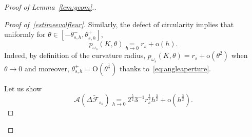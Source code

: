 \documentclass[AHL,Unicode,longabstracts,published]{cedram}
\newcommand{\cA}{\mathcal{A}}
\newcommand{\cF}{\mathcal{F}}
\newcommand{\od}{\mathrm{o}}
\newcommand{\Odd}{\mathrm{O}}
\newcommand{\noi}{\noindent}
\newenvironment*{prooff}{\begin{proof}}{\let\qed\relax\end{proof}}
\begin{document}
\begin{proof}[{Proof of Lemma~\ref{lem:geom}.}]
\begin{prooff}[{Proof of~\eqref{estimeevolfleur}}]
Similarly, the defect of circularity implies that uniformly for $\theta\in [-\theta_{s,h}^-,\theta_{s,h}^+]$,
\begin{equation}\label{eq:defectcircularity}
p_{\omega_s}(K,\theta) \underset{h\to 0}{=} r_s+\od(h).
\end{equation}
Indeed, by definition of the curvature radius, $p_{\omega_s}(K,\theta)=r_s+\od(\theta^2)$ when $\theta\to 0$ and moreover, $\theta_{s,h}^{\pm}=\Odd(\theta^{\frac12})$ thanks to~\eqref{eq:angleaperture}.

Let us show
\begin{equation}\label{eq:voldifflow2}
\cA\left(\Delta\widetilde{\cF}_{s_h}\right)\underset{h\to 0}{=}2^{\frac{5}{2}}3^{-1} r_s^{\frac1{2}}h^{\frac{3}{2}} + \od\left(h^{\frac32}\right).
\end{equation}


\end{prooff}
\end{proof}
\end{document}
